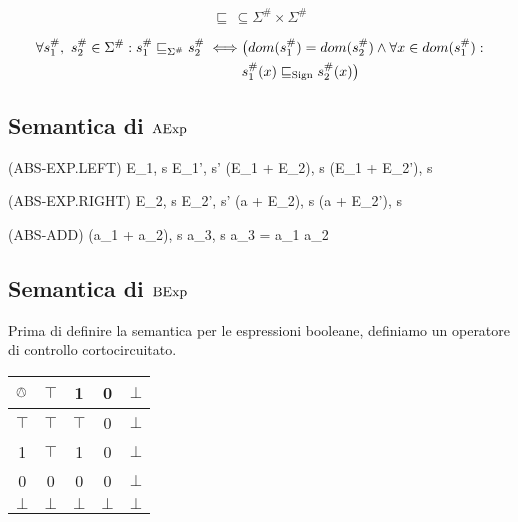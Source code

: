 \begin{definizione}
\[
	\sqsubseteq\, \subseteq \Sigma^\# \times \Sigma^\#
\]
\end{definizione}
\begin{align*}
	\forall s_1^\#,\ s_2^\# \in \Sigma^\# : s_1^\# \sqsubseteq_{\Sigma^\#} s_2^\# \iff &\bigl(dom(s_1^\#) = dom(s_2^\#) \land \forall x \in dom(s_1^\#) : \\
	& s_1^\#(x) \sqsubseteq_{\mathrm{Sign}} s_2^\#(x) \bigr)
\end{align*}

\subsection{Semantica di $\mathrm{AExp}$}

\begin{center}
	(ABS-EXP.LEFT)
	\prooftree
		\langle E_1, s \rangle \rightarrow \langle E_1', s' \rangle
		\justifies
		\langle (E_1 + E_2), s \rangle \rightarrow \langle (E_1 + E_2'), s \rangle		
	\endprooftree
\end{center}

\begin{center}
	(ABS-EXP.RIGHT)
	\prooftree
		\langle E_2, s \rangle \rightarrow \langle E_2', s' \rangle
		\justifies
		\langle (a + E_2), s \rangle \rightarrow \langle (a + E_2'), s\rangle
	\endprooftree
\end{center}

\begin{center}
	(ABS-ADD)
	\prooftree
		\justifies
		\langle (a_1 + a_2), s \rangle \rightarrow \langle a_3, s \rangle 
		\using a_3 = a_1 \absadd a_2
	\endprooftree
\end{center}

\subsection{Semantica di $\mathrm{BExp}$}

\begin{definizione}
Prima di definire la semantica per le espressioni booleane,
definiamo un operatore di controllo cortocircuitato.
\end{definizione}

\begin{center}
	\begin{tabular}{ c | c c c c }
		$\mathrel{\owedge}$ & $\top$ & 1 & 0 & $\bot$ \\
		\hline
		$\top$ & $\top$ & $\top$ & 0 & $\bot$ \\
		1 & $\top$ & 1 & 0 & $\bot$ \\
		0 & 0 & 0 & 0 & $\bot$ \\
		$\bot$ & $\bot$ & $\bot$ & $\bot$ & $\bot$
	\end{tabular}
\end{center} 
